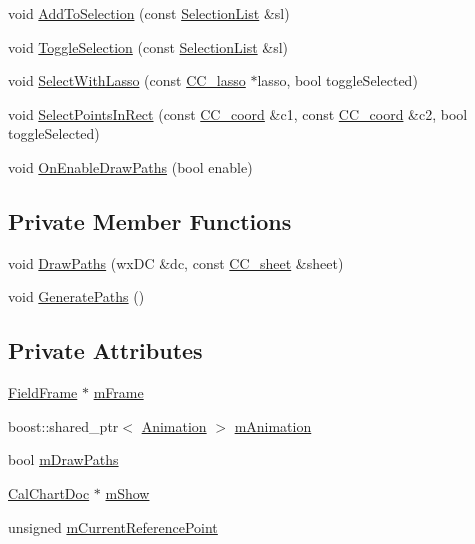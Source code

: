 \begin{DoxyCompactItemize}
\item 
void \hyperlink{a00103_a24d26ea0e220eaaaa12530be340e10a9}{Add\-To\-Selection} (const \hyperlink{a00214_aaec86d4bb87e1e6f0b60e6e551c5e570}{Selection\-List} \&sl)
\item 
void \hyperlink{a00103_a21d77330d0bec13cf298baf0633a370f}{Toggle\-Selection} (const \hyperlink{a00214_aaec86d4bb87e1e6f0b60e6e551c5e570}{Selection\-List} \&sl)
\item 
void \hyperlink{a00103_aeed3db4ad3c18d8b76c054c795582c88}{Select\-With\-Lasso} (const \hyperlink{a00033}{C\-C\-\_\-lasso} $\ast$lasso, bool toggle\-Selected)
\item 
void \hyperlink{a00103_a7dfe8e917fb45beb011406503ad05810}{Select\-Points\-In\-Rect} (const \hyperlink{a00029}{C\-C\-\_\-coord} \&c1, const \hyperlink{a00029}{C\-C\-\_\-coord} \&c2, bool toggle\-Selected)
\item 
void \hyperlink{a00103_a88442016c25e8595308a6b16436c49de}{On\-Enable\-Draw\-Paths} (bool enable)
\end{DoxyCompactItemize}
\subsection*{Private Member Functions}
\begin{DoxyCompactItemize}
\item 
void \hyperlink{a00103_a5c5722a1a6a331ead8ef3f3690c9542d}{Draw\-Paths} (wx\-D\-C \&dc, const \hyperlink{a00045}{C\-C\-\_\-sheet} \&sheet)
\item 
void \hyperlink{a00103_a27bba2ec1e98c2d0ba0eb33f0cead324}{Generate\-Paths} ()
\end{DoxyCompactItemize}
\subsection*{Private Attributes}
\begin{DoxyCompactItemize}
\item 
\hyperlink{a00102}{Field\-Frame} $\ast$ \hyperlink{a00103_a8a52621f503b9b74b09c26f6e1d78a0a}{m\-Frame}
\item 
boost\-::shared\-\_\-ptr$<$ \hyperlink{a00010}{Animation} $>$ \hyperlink{a00103_aa943e4e9503b3ac2efbefec278a7f175}{m\-Animation}
\item 
bool \hyperlink{a00103_aef9dc54552347e9303e96dcd9ac00ce6}{m\-Draw\-Paths}
\item 
\hyperlink{a00020}{Cal\-Chart\-Doc} $\ast$ \hyperlink{a00103_ad4b69c163c69e76a79522a685ecdc2e6}{m\-Show}
\item 
unsigned \hyperlink{a00103_a7975b283531cc459f92884dc1038077c}{m\-Current\-Reference\-Point}
\end{DoxyCompactItemize}


